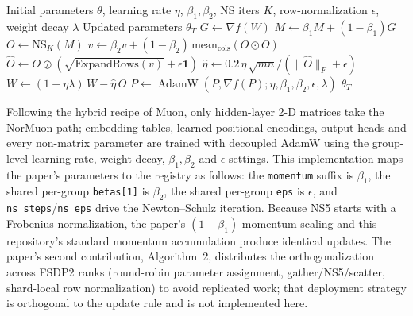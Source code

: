 \begin{algorithm}[H]
\caption{NorMuon (Neuron-wise Normalized Muon)}
\label{alg:normuon}
\begin{algorithmic}[1]
\Require Initial parameters $\theta$, learning rate $\eta$, $\beta_1, \beta_2$, NS iters $K$, row-normalization $\epsilon$, weight decay $\lambda$
\Ensure Updated parameters $\theta_T$
        \State $G \gets \nabla f(W)$ 
        \State $M \gets \beta_1 M + (1-\beta_1) G$ 
        \State $O \gets \mathrm{NS}_K(M)$ 
        \State $v \gets \beta_2 v + (1-\beta_2)\,\mathrm{mean}_{\mathrm{cols}}(O \odot O)$ 
        \State $\widehat{O} \gets O \oslash (\sqrt{\mathrm{ExpandRows}(v)} + \epsilon\mathbf{1})$ 
        \State $\hat\eta \gets 0.2\,\eta\,\sqrt{mn} / (\|\widehat{O}\|_F + \epsilon)$ 
        \State $W \gets (1-\eta\lambda)\,W - \hat\eta\,\widehat{O}$ 
    \Else
        \State $P \gets \operatorname{AdamW}(P, \nabla f(P); \eta, \beta_1, \beta_2, \epsilon, \lambda)$ 
    \EndIf
\EndFor
\Return $\theta_T$
\end{algorithmic}
\end{algorithm}

Following the hybrid recipe of Muon, only hidden-layer 2-D matrices take the NorMuon
path; embedding tables, learned positional encodings, output heads and every non-matrix
parameter are trained with decoupled AdamW using the group-level learning rate, weight
decay, $\beta_1, \beta_2$ and $\epsilon$ settings. This implementation maps the paper's
parameters to the registry as follows: the \texttt{momentum} suffix is $\beta_1$, the
shared per-group \texttt{betas[1]} is $\beta_2$, the shared per-group \texttt{eps} is
$\epsilon$, and \texttt{ns\_steps}/\texttt{ns\_eps} drive the Newton--Schulz iteration.
Because NS5 starts with a Frobenius normalization, the paper's $(1-\beta_1)$ momentum
scaling and this repository's standard momentum accumulation produce identical updates.
The paper's second contribution, Algorithm~2, distributes the orthogonalization across
FSDP2 ranks (round-robin parameter assignment, gather/NS5/scatter, shard-local row
normalization) to avoid replicated work; that deployment strategy is orthogonal to the
update rule and is not implemented here.


